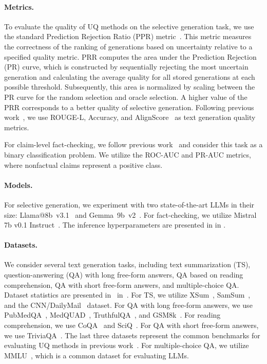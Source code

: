 \documentclass[11pt]{article}
\begin{document}
\paragraph{Metrics.}
  To evaluate the quality of UQ methods on the selective generation task, we use the standard Prediction Rejection Ratio (PPR) metric~\cite{malinin21uncertainty,vashurin2024benchmakring}. This metric measures the correctness of the ranking of generations based on uncertainty relative to a specified quality metric. PRR computes the area under the Prediction Rejection (PR) curve, which is constructed by sequentially rejecting the most uncertain generation and calculating the average quality for all stored generations at each possible threshold. Subsequently, this area is normalized by scaling between the PR curve for the random selection and oracle selection. A higher value of the PRR corresponds to a better quality of selective generation. Following previous work~\cite{vashurin2024benchmakring}, we use ROUGE-L, Accuracy, and AlignScore~\cite{zha-etal-2023-alignscore} as text generation quality metrics.

  For claim-level fact-checking, we follow previous work~\cite{fadeeva2024factchecking} and consider this task as a binary classification problem. We utilize the ROC-AUC and PR-AUC metrics, where nonfactual claims represent a positive class.

\paragraph{Models.}
  For selective generation, we experiment with two state-of-the-art LLMs in their size: Llama@8b~v3.1~\cite{llama3} and Gemma~9b~v2~\cite{gemma2}. For fact-checking, we utilize Mistral 7b v0.1 Instruct~\cite{mistral}. The inference hyperparameters are presented in  in .

\paragraph{Datasets.}

  

  We consider several text generation tasks, including text summarization (TS), question-answering (QA) with long free-form answers, QA based on reading comprehension, QA with short free-form answers, and multiple-choice QA. Dataset statistics are presented in~ in~. For TS, we utilize XSum~\cite{xsum}, SamSum~\cite{gliwa-etal-2019-samsum}, and the CNN/DailyMail~\cite{see-etal-2017-get} dataset. For QA with long free-form answers, we use PubMedQA~\cite{jin-etal-2019-pubmedqa}, MedQUAD~\cite{medquad}, TruthfulQA~\cite{lin-etal-2022-truthfulqa}, and GSM8k~\cite{gsm8k}. For reading comprehension, we use CoQA~\cite{coqa} and SciQ~\cite{welbl-etal-2017-crowdsourcing}. For QA with short free-form answers, we use TriviaQA~\cite{joshi-etal-2017-triviaqa}. The last three datasets represent the common benchmarks for evaluating UQ methods in previous work~\cite{kuhn2023semantic,duan-etal-2024-shifting,lin2023generating}. For multiple-choice QA, we utilize MMLU~\cite{mmlu}, which is a common dataset for evaluating LLMs.
\end{document}
